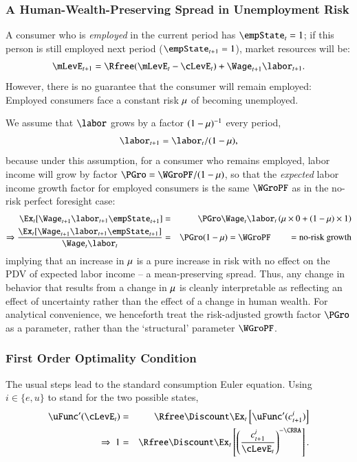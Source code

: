 \documentclass[titlepage,abstract]{\econtex}\newcommand{\texname}{ctDiscrete}
\begin{document}
\subsubsection{A Human-Wealth-Preserving Spread in Unemployment Risk}
A consumer who is \textit{employed} in the current period has $\empState_{t}=1$; if this person is still employed next period ($\empState_{t+1}=1$), market resources will be:
\begin{equation}
\mLevE_{t+1} = \Rfree(\mLevE_{t}-\cLevE_{t})+\Wage_{t+1}\labor_{t+1} \label{eq:Metp1}
.
\end{equation}
However, there is no guarantee that the consumer will remain employed: Employed consumers face a constant risk $\mu$ of becoming unemployed.  

We assume that $\labor$ grows by a factor $(1-\mu)^{-1}$ every period,
\begin{equation}
\labor_{t+1} =    \labor_{t}/(1-\urate) 
\label{eq:meanPreserve}
,
\end{equation}
because under this assumption, for a consumer who remains employed, labor income will grow by factor $\PGro=\WGroPF/(1-\urate)$,
so that the \textit{expected} labor income growth factor for employed consumers is the same $\WGroPF$ as in the no-risk perfect foresight case:
\begin{eqnarray*}
   \Ex_{t}[\Wage_{t+1}\labor_{t+1}\empState_{t+1}] 
   & = &  
   \PGro \Wage_{t} \labor_{t} \left(\urate \times 0 + (1-\urate) \times 1 \right)
\\ 
\Rightarrow 
\frac{\Ex_{t}[\Wage_{t+1}\labor_{t+1}\empState_{t+1}]}{\Wage_{t} \labor_{t}} &  = & \PGro (1-\urate) = \WGroPF \hspace{20pt} = \text{no-risk growth}
\end{eqnarray*}
implying that an increase in $\mu$ is a pure increase in risk with
no effect on the PDV of expected labor income -- a mean-preserving
spread.  Thus, any change in behavior that
results from a change in $\mu$ is cleanly interpretable as
reflecting an effect of uncertainty rather than the effect of a change
in human wealth. For analytical convenience, we henceforth treat the risk-adjusted growth factor $\PGro$ as a parameter, rather than the `structural' parameter $\WGroPF$.


\subsubsection{First Order Optimality Condition}
The usual steps lead to the standard consumption Euler equation. Using $i \in \{e,u\}$ to stand for the two possible states,
\begin{eqnarray}
     \uFunc^{\prime}(\cLevE_{t}) & = & \Rfree\Discount \Ex_{t}\left[\uFunc^{\prime}(\cLev^{i}_{t+1}) \right] \nonumber
\\
\Rightarrow \ 
   1         & = & \Rfree\Discount \Ex_{t}\left[\left(\frac{\cLev^{i}_{t+1}}{\cLevE_{t}}\right)^{-\CRRA} \right]
.
\end{eqnarray}
\end{document}
